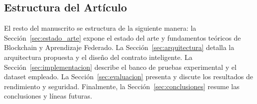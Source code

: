 \subsection{Estructura del Artículo}
El resto del manuscrito se estructura de la siguiente manera: la Sección~\ref{sec:estado_arte} expone el estado del arte y fundamentos teóricos de Blockchain y Aprendizaje Federado. La Sección~\ref{sec:arquitectura} detalla la arquitectura propuesta y el diseño del contrato inteligente. La Sección~\ref{sec:implementacion} describe el banco de pruebas experimental y el dataset empleado. La Sección~\ref{sec:evaluacion} presenta y discute los resultados de rendimiento y seguridad. Finalmente, la Sección~\ref{sec:conclusiones} resume las conclusiones y líneas futuras.

